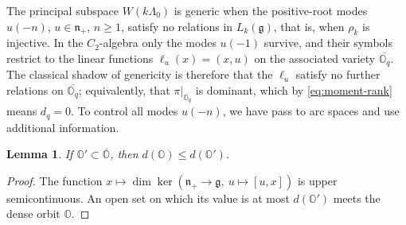 \documentclass[11pt]{amsart}
\newtheorem{lemma}[theorem]{Lemma}
\theoremstyle{definition}
\theoremstyle{remark}
\newcommand{\g}{\mathfrak g}
\newcommand{\n}{\mathfrak n_+}
\begin{document}
 The principal subspace $W(k\Lambda_0)$ is generic when the
positive-root modes $u(-n)$, $u\in\mathfrak n_+$, $n\ge1$, satisfy no relations in
$L_k(\mathfrak g)$, that is, when $\rho_k$ is injective. In the $C_2$-algebra only the modes
$u(-1)$ survive, and their symbols restrict to the linear functions $\ell_u(x)=(x,u)$ on the
associated variety $\overline{\mathbb O_q}$. The classical shadow of genericity is therefore that the
$\ell_u$ satisfy no further relations on $\overline{\mathbb O_q}$; equivalently, that
$\pi|_{\overline{\mathbb O_q}}$ is dominant, which by \eqref{eq:moment-rank} means $d_q=0$. 
To control all
modes $u(-n)$, we have pass to arc spaces and use additional information. 
\color{black}


\begin{lemma}\label{lem:semicontinuity}
If $\mathbb O'\subset\overline{\mathbb O}$, then
$d(\mathbb O)\le d(\mathbb O')$.
\end{lemma}
\begin{proof}
The function $x\mapsto\dim\ker(\n\to\g,\ u\mapsto[u,x])$
is upper semicontinuous. An open set on which its value is at most
$d(\mathbb O')$ meets the dense orbit $\mathbb O$.
\end{proof}
\end{document}
